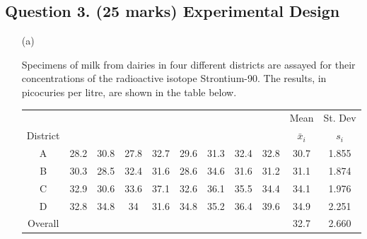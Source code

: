 \documentclass[a4paper,12pt]{article}
\begin{document}
\subsection*{Question 3. (25 marks) Experimental Design }
\begin{itemize}
	\item [(a)]

Specimens of milk from dairies in four different districts are assayed for their concentrations of the radioactive isotope Strontium-90. 
The results, in picocuries per litre, are shown in the table below.


	\begin{center}
		\begin{tabular}{|c|cccccccc|c|c|}
			\hline  

	 & &&&&&&& & Mean & St. Dev \\  
		District	&  &&&&&&&& $\bar{x}_i$ & $s_{i}$ \\  
		\hline \hline
A&	28.2	&	30.8	&	27.8	&	32.7	&	29.6	&	31.3	&	32.4	&	32.8	&	30.7	&	1.855	\\ \hline
B&	30.3	&	28.5	&	32.4	&	31.6	&	28.6	&	34.6	&	31.6	&	31.2	&	31.1	&	1.874	\\ \hline
C&	32.9	&	30.6	&	33.6	&	37.1	&	32.6	&	36.1	&	35.5	&	34.4	&	34.1	&	1.976	\\ \hline
D&	32.8	&	34.8	&	34	&	31.6	&	34.8	&	35.2	&	36.4	&	39.6	&	34.9	&	2.251	\\ \hline \hline
			Overall & &&&&&&&&	32.7	&	2.660	\\ \hline
		\end{tabular} 
	\end{center}


\bigskip
{

}
\end{itemize}
\end{document}
